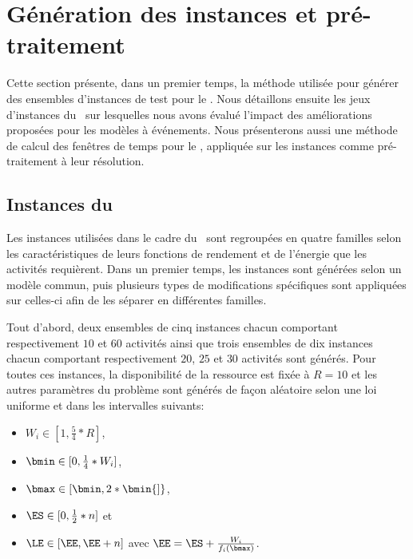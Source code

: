 \section{Génération des instances et pré-traitement}
\label{sec:instance}
Cette section présente, dans un premier temps, la méthode utilisée
pour générer des ensembles d'instances de test pour le \CECSP. Nous
détaillons ensuite les jeux d'instances du \RCPSP~sur lesquelles nous
avons évalué l'impact des améliorations proposées pour les modèles à
événements. Nous présenterons aussi une méthode de calcul des fenêtres
de temps pour le \RCPSP, appliquée sur les instances comme
pré-traitement à leur résolution.

\subsection{Instances du \CECSP}
\label{sec:instance_CECSP}

Les instances utilisées dans le cadre du \CECSP~sont regroupées en
quatre familles selon les caractéristiques de leurs fonctions de
rendement et de l'énergie que les activités requièrent. Dans un
premier temps, les instances sont générées selon un modèle commun,
puis plusieurs types de modifications spécifiques sont appliquées sur
celles-ci afin de les séparer en différentes familles. 

Tout d'abord, deux ensembles de cinq instances chacun comportant
respectivement $10$ et $60$ activités ainsi que trois ensembles de dix
instances chacun comportant respectivement $20$, $25$ et $30$
activités sont générés. Pour toutes ces instances, la disponibilité de
la ressource est fixée à $R=10$ et les autres paramètres du problème
sont générés de façon aléatoire selon une loi uniforme et dans les
intervalles suivants:
\begin{itemize}
\item $W_i \in [1 , \frac{5}{4} * R]$,
\item $\bmin \in [0, \frac{1}{4} * W_i]$,
\item $\bmax \in [\bmin , 2 * \bmin {]}$,
\item $\ES \in [0,\frac{1}{2}*n]$ et
\item $\LE \in [ \EE, \EE + n ]$ avec $\EE = \ES +
\frac{W_i}{f_i(\bmax)}$.
\end{itemize}

